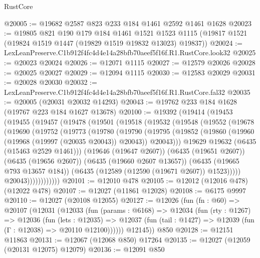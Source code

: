 \begin{lexlean}{RustCore}
\begin{coremodule}
@20005 := @19682 @2587 @823 @233 @184 @1461 @2592 @1461 @1628
@20023 := @19805
    @821
    @190
    @179
    @184
    @1461
    @1521
    @1523
    @1115
    (@19817 @1521 (@19824 @1519 @1447 (@19829 @1519 @19832 @13023) @19837))
@20024 := LexLeanPreserve.C1b912f4fc4d4e14a28bfb70aeef5f16f.R1.RustCore.look32
@20025 := @20023 @20024
@20026 := @12071 @1115
@20027 := @12579 @20026
@20028 := @20025 @20027
@20029 := @12094 @1115
@20030 := @12583 @20029
@20031 := @20028 @20030
@20032 := LexLeanPreserve.C1b912f4fc4d4e14a28bfb70aeef5f16f.R1.RustCore.fal32
@20035 := @20005 (@20031 @20032 @14293)
@20043 := @19762 @233 @184 @1628 (@19767 @223 @184 @1627 @13678)
@20100 := @19392
    (@19414
      (@19453
        (@19455
          (@19457
            (@19478
              (@19501
                (@19518
                  (@19532
                    (@19548
                      (@19552
                        (@19678
                          (@19690
                            (@19752
                              (@19773
                                (@19780
                                  (@19790
                                    (@19795
                                      (@19852
                                        (@19860
                                          (@19960 (@19968 (@19997 (@20035 @20043)) @20043))
                                          @20043)))
                                    @19629
                                    @19632
                                    (@6435 (@15463 @2529 @1461)))
                                  (@19646 (@19647 @2607))
                                  (@6435 (@19651 @2607))
                                  (@6435 (@19656 @2607))
                                  (@6435 (@19660 @2607 @13657))
                                  (@6435 (@19665 @793 @13657 @184))
                                  (@6435 (@12589 (@12590 (@19671 @2607)) @1523)))))
                            @20043))))))))))))
@20101 := @12010 @478
@20105 := @12012 (@12016 @478) (@12022 @478)
@20107 := @12027 (@11861 @12028)
@20108 := @6175 @9997
@20110 := @12027 (@20108 @12055)
@20127 := @12026
    (fun (fn : @60) =>
    @20107
      (@12031
        (@12033
          (fun (params : @6168) =>
          @12034
            (fun (rty : @1267) =>
            @12036
              (fun (lets : @12035) =>
              @12037 (fun (tail : @1427) => @12039 (fun (Γ : @12038) => @20110 @12100))))))
        @12145))
    @850
@20128 := @12151 @11863
@20131 := @12067 (@12068 @850) @17264
@20135 := @12027 (@12059 (@20131 @12075) @12079)
@20136 := @12091 @850

\end{coremodule}
\end{lexlean}
